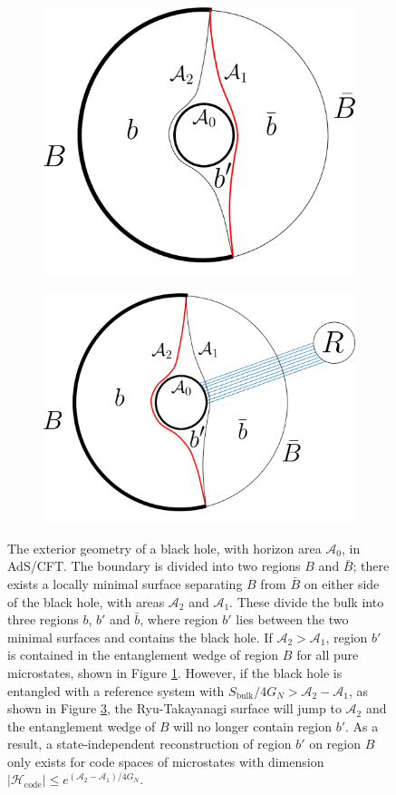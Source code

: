 \documentclass[12pt]{article}
\begin{document}
\begin{figure}[t]
\begin{subfigure}{.48\textwidth}
\includegraphics[width = 0.8\linewidth]{BHEntanglementWedge.png}
\centering
\caption{}
\label{fig:BHent}
\end{subfigure}
\begin{subfigure}{.48\textwidth}
\includegraphics[width = 0.95\linewidth]{BH+REntanglementWedge.png}
\centering
\caption{}
\label{fig:BHRent}
\end{subfigure}
\caption{The exterior geometry of a black hole, with horizon area $\mathcal{A}_0$, in AdS/CFT. The boundary is divided into two regions $B$ and $\bar B$; there exists a locally minimal surface separating $B$ from $\bar{B}$ on either side of the black hole, with areas $\mathcal{A}_2$ and $\mathcal{A}_1$. These divide the bulk into three regions $b$, $b'$ and $\bar{b}$, where region $b'$ lies between the two minimal surfaces and contains the black hole. If $\mathcal{A}_2 > \mathcal{A}_1$, region $b'$ is contained in the entanglement wedge of region $B$ for all pure microstates, shown in Figure \ref{fig:BHent}. However, if the black hole is entangled with a reference system with $S_\text{bulk} / 4G_N> \mathcal{A}_2 - \mathcal{A}_1$, as shown in Figure \ref{fig:BHRent}, the Ryu-Takayanagi surface will jump to $\mathcal{A}_2$ and the entanglement wedge of $B$ will no longer contain region $b'$. As a result, a state-independent reconstruction of region $b'$ on region $B$ only exists for code spaces of microstates with dimension $|\mathcal{H}_\text{code}| \leq e^{(\mathcal{A}_2 -\mathcal{A}_1)/4G_N}$. }

\end{figure}
\end{document}
